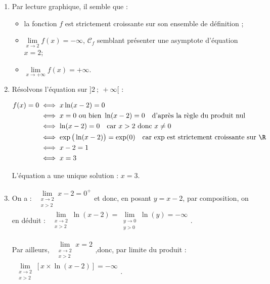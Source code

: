 \begin{enumerate}
	\item Par lecture graphique, il semble que :
	\begin{itemize}
		\item la fonction $f$ est strictement croissante sur son ensemble de définition ;
		\item $\lim\limits_{x \to 2} f(x) = -\infty$, $\mathcal{C}_f$ semblant présenter une asymptote d'équation $x = 2$;
		\item $\lim\limits_{x \to +\infty} f(x) = +\infty$.
	\end{itemize}

	\item Résolvons l'équation sur $]2~;~+\infty[$ :

$\begin{aligned}
		f(x) = 0&\iff x\ln(x- 2) = 0\\
		& \iff x = 0 \text{ ou bien } \ln(x-2) = 0\quad \text{d'après la règle du produit nul}\\
		& \iff \ln(x-2) = 0\quad \text{car } x > 2\text{ donc } x\neq 0\\
		& \iff \exp\big(\ln(x-2)\big) = \exp(0)\quad \text{car exp est strictement croissante sur }\R\\
		& \iff x-2 = 1\\
		&\iff x = 3
\end{aligned}$

	L'équation a une unique solution : $x = 3$.

	\item On a : \quad $\begin{gathered}\lim\limits_{\substack{x \to 2\\x > 2}} x - 2 = 0^{+}\end{gathered}$\quad et donc, en posant $y = x - 2$, par composition, on en déduit :
	 $\begin{gathered}\lim\limits_{\substack{x \to 2\\x > 2}} \ln(x - 2) = \lim\limits_{\substack{y \to 0\\y > 0}} \ln(y) = -\infty\end{gathered}$.

Par ailleurs, \quad $\begin{gathered}\lim\limits_{\substack{x \to 2\\x > 2}} x = 2\end{gathered}$,\quad donc, par limite du produit : \quad $\begin{gathered}\lim\limits_{\substack{x \to 2\\x > 2}}[ x\times \ln(x-2)] = -\infty \end{gathered}$.


\end{enumerate}
